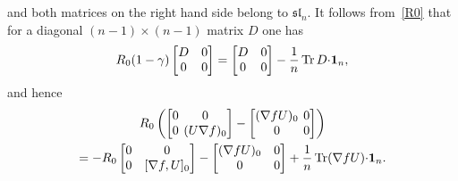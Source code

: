 \documentclass{amsart}
\theoremstyle{definition}
\theoremstyle{remark}
\numberwithin{equation}{section}
\numberwithin{theorem}{section}
\def\nablac{{\nabla}}
\def\nar{\setlength\arraycolsep{2pt}}
\def\one{\mathbf 1}
\def\sl{\mathfrak {sl}}
\def\Tr{\operatorname{Tr}}
\begin{document}
and both matrices on the right hand side belong to $\sl_n$. 
It follows from~\eqref{R0} that for a diagonal $(n-1)\times(n-1)$ matrix $D$ one has
\[
R_0(1-\gamma)\begin{bmatrix} D & 0\cr 0& 0\end{bmatrix}=
\begin{bmatrix} D & 0\cr 0& 0\end{bmatrix}-\frac1n\Tr D{\cdot}\one_n,
\]
and  hence
\begin{multline*}
R_0 \left(\nar\begin{bmatrix} 0 & 0\cr 0& (U\nablac f)_0\end{bmatrix}-\begin{bmatrix}(\nablac f U)_0&0\cr 0 & 0\end{bmatrix}\right)\\=
-R_0\begin{bmatrix} 0 & 0\cr 0& [\nablac f,U]_0\end{bmatrix}-\begin{bmatrix}(\nablac f U)_0&0\cr 0 & 0\end{bmatrix}
+\frac1n\Tr (\nabla f U){\cdot}\one_n.
\end{multline*}
 
\end{document}
